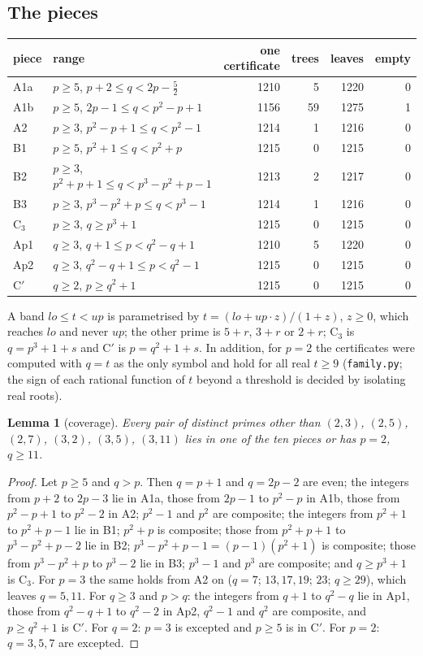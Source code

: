 \documentclass[11pt,a4paper]{amsart}
\newtheorem{lemma}[theorem]{Lemma}
\theoremstyle{definition}
\theoremstyle{remark}
\newcommand{\file}[1]{\texttt{#1}}
\begin{document}
\subsection{The pieces}\label{ss:pieces}
\begin{center}\small
\begin{tabular}{llrrrr}
\toprule
piece & range & one certificate & trees & leaves & empty \\
\midrule
A1a & $p\ge5$, $p+2\le q<2p-\tfrac52$ & 1210 & 5 & 1220 & 0\\
A1b & $p\ge5$, $2p-1\le q<p^2-p+1$ & 1156 & 59 & 1275 & 1\\
A2 & $p\ge3$, $p^2-p+1\le q<p^2-1$ & 1214 & 1 & 1216 & 0\\
B1 & $p\ge5$, $p^2+1\le q<p^2+p$ & 1215 & 0 & 1215 & 0\\
B2 & $p\ge3$, $p^2+p+1\le q<p^3-p^2+p-1$ & 1213 & 2 & 1217 & 0\\
B3 & $p\ge3$, $p^3-p^2+p\le q<p^3-1$ & 1214 & 1 & 1216 & 0\\
C$_3$ & $p\ge3$, $q\ge p^3+1$ & 1215 & 0 & 1215 & 0\\
Ap1 & $q\ge3$, $q+1\le p<q^2-q+1$ & 1210 & 5 & 1220 & 0\\
Ap2 & $q\ge3$, $q^2-q+1\le p<q^2-1$ & 1215 & 0 & 1215 & 0\\
C$'$ & $q\ge2$, $p\ge q^2+1$ & 1215 & 0 & 1215 & 0\\
\bottomrule
\end{tabular}
\end{center}
A band $\mathit{lo}\le t<\mathit{up}$ is parametrised by $t=(\mathit{lo}+\mathit{up}\cdot z)/(1+z)$, $z\ge0$,
which reaches $\mathit{lo}$ and never $\mathit{up}$; the other prime is $5+r$, $3+r$ or $2+r$; C$_3$ is
$q=p^3+1+s$ and C$'$ is $p=q^2+1+s$. In addition, for $p=2$ the certificates were computed with $q=t$ as the
only symbol and hold for all real $t\ge9$ (\file{family.py}; the sign of each rational function of $t$ beyond a
threshold is decided by isolating real roots).

\begin{lemma}[coverage]\label{lem:cover}
Every pair of distinct primes other than $(2,3)$, $(2,5)$, $(2,7)$, $(3,2)$, $(3,5)$, $(3,11)$ lies in one of
the ten pieces or has $p=2$, $q\ge11$.
\end{lemma}

\begin{proof}
Let $p\ge5$ and $q>p$. Then $q=p+1$ and $q=2p-2$ are even; the integers from $p+2$ to $2p-3$ lie in A1a, those
from $2p-1$ to $p^2-p$ in A1b, those from $p^2-p+1$ to $p^2-2$ in A2; $p^2-1$ and $p^2$ are composite; the
integers from $p^2+1$ to $p^2+p-1$ lie in B1; $p^2+p$ is composite; those from $p^2+p+1$ to $p^3-p^2+p-2$ lie in
B2; $p^3-p^2+p-1=(p-1)(p^2+1)$ is composite; those from $p^3-p^2+p$ to $p^3-2$ lie in B3; $p^3-1$ and $p^3$ are
composite; and $q\ge p^3+1$ is C$_3$. For $p=3$ the same holds from A2 on ($q=7$; $13,17,19$; $23$; $q\ge29$),
which leaves $q=5,11$. For $q\ge3$ and $p>q$: the integers from $q+1$ to $q^2-q$ lie in Ap1, those from
$q^2-q+1$ to $q^2-2$ in Ap2, $q^2-1$ and $q^2$ are composite, and $p\ge q^2+1$ is C$'$. For $q=2$: $p=3$ is
excepted and $p\ge5$ is in C$'$. For $p=2$: $q=3,5,7$ are excepted.
\end{proof}
\end{document}

